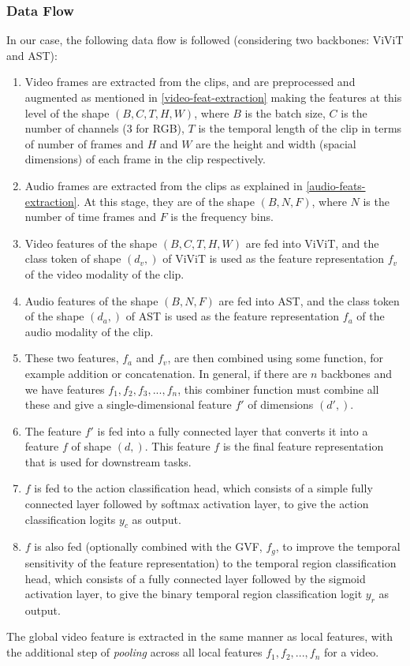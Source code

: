 \subsubsection{Data Flow} In our case, the following data flow is followed (considering two backbones: ViViT and AST):
\begin{enumerate}
	\item Video frames are extracted from the clips, and are preprocessed and augmented as mentioned in \ref{video-feat-extraction} making the features at this level of the shape $(B, C, T, H, W)$, where $B$ is the batch size, $C$ is the number of channels (3 for RGB), $T$ is the temporal length of the clip in terms of number of frames and $H$ and $W$ are the height and width (spacial dimensions) of each frame in the clip respectively.
	\item Audio frames are extracted from the clips as explained in \ref{audio-feats-extraction}. At this stage, they are of the shape $(B, N, F)$, where $N$ is the number of time frames and $F$ is the frequency bins.
	\item Video features of the shape $(B, C, T, H, W)$ are fed into ViViT, and the class token of shape $(d_v, )$ of ViViT is used as the feature representation $f_v$ of the video modality of the clip.
	\item Audio features of the shape $(B, N, F)$ are fed into AST, and the class token of the shape $(d_a, )$ of AST is used as the feature representation $f_a$ of the audio modality of the clip.
	\item These two features, $f_a$ and $f_v$, are then combined using some function, for example addition or concatenation. In general, if there are $n$ backbones and we have features $f_1, f_2, f_3, ..., f_n$, this combiner function must combine all these and give a single-dimensional feature $f'$ of dimensions $(d', )$. 
	\item The feature $f'$ is fed into a fully connected layer that converts it into a feature $f$ of shape $(d, )$. This feature $f$ is the final feature representation that is used for downstream tasks.
	\item $f$ is fed to the action classification head, which consists of a simple fully connected layer followed by softmax activation layer, to give the action classification logits $y_c$ as output.
	\item $f$ is also fed (optionally combined with the GVF, $f_g$, to improve the temporal sensitivity of the feature representation) to the temporal region classification head, which consists of a fully connected layer followed by the sigmoid activation layer, to give the binary temporal region classification logit $y_r$ as output.
\end{enumerate}
\par The global video feature is extracted in the same manner as local features, with the additional step of \textit{pooling} across all local features ${f_1, f_2, ..., f_n}$ for a video. 


